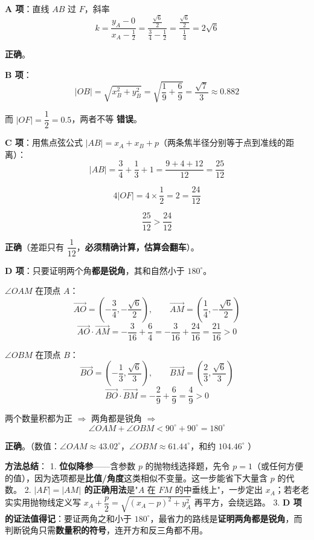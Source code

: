 \par\medskip

\textbf{A 项}：直线 $AB$ 过 $F$，斜率
\[k=\frac{y_A-0}{x_A-\frac12}=\frac{\frac{\sqrt6}2}{\frac34-\frac12}=\frac{\frac{\sqrt6}2}{\frac14}=2\sqrt6\]

 \textbf{正确}。

\par\medskip

\textbf{B 项}：
\[|OB|=\sqrt{x_B^{2}+y_B^{2}}=\sqrt{\frac19+\frac69}=\frac{\sqrt7}3\approx0.882\]

而 $|OF|=\dfrac12=0.5$，两者不等  \textbf{错误}。

\par\medskip

\textbf{C 项}：用焦点弦公式 $|AB|=x_A+x_B+p$（两条焦半径分别等于点到准线的距离）：
\[|AB|=\frac34+\frac13+1=\frac{9+4+12}{12}=\frac{25}{12}\]

\[4|OF|=4\times\frac12=2=\frac{24}{12}\]

\[\frac{25}{12}>\frac{24}{12}\]

 \textbf{正确}（差距只有 $\dfrac1{12}$，\textbf{必须精确计算，估算会翻车}）。

\par\medskip

\textbf{D 项}：只要证明两个角\textbf{都是锐角}，其和自然小于 $180^\circ$。

$\angle OAM$ 在顶点 $A$：
\[\overrightarrow{AO}=\left(-\frac34,-\frac{\sqrt6}2\right),\qquad\overrightarrow{AM}=\left(\frac14,-\frac{\sqrt6}2\right)\]
\[\overrightarrow{AO}\cdot\overrightarrow{AM}=-\frac3{16}+\frac64=-\frac3{16}+\frac{24}{16}=\frac{21}{16}>0\]

$\angle OBM$ 在顶点 $B$：
\[\overrightarrow{BO}=\left(-\frac13,\frac{\sqrt6}3\right),\qquad\overrightarrow{BM}=\left(\frac23,\frac{\sqrt6}3\right)\]
\[\overrightarrow{BO}\cdot\overrightarrow{BM}=-\frac29+\frac69=\frac49>0\]

两个数量积都为正 $\Rightarrow$ 两角都是锐角 $\Rightarrow$
\[\angle OAM+\angle OBM<90^\circ+90^\circ=180^\circ\]

 \textbf{正确}。（数值：$\angle OAM\approx43.02^\circ$，$\angle OBM\approx61.44^\circ$，和约 $104.46^\circ$ ）


\begin{gktip}
\textbf{方法总结}：
1. \textbf{位似降参}——含参数 $p$ 的抛物线选择题，先令 $p=1$（或任何方便的值），因为选项都是\textbf{比值/角度}这类相似不变量。这一步能省下大量含 $p$ 的代数。
2. \textbf{$|AF|=|AM|$ 的正确用法}是"$A$ 在 $FM$ 的中垂线上"，一步定出 $x_A$；若老老实实用抛物线定义写 $x_A+\dfrac p2=\sqrt{(x_A-p)^2+y_A^2}$ 再平方，会绕远路。
3. \textbf{D 项的证法值得记}：要证两角之和小于 $180^\circ$，最省力的路线是\textbf{证明两角都是锐角}，而判断锐角只需\textbf{数量积的符号}，连开方和反三角都不用。
\end{gktip}

